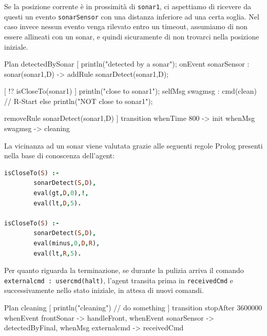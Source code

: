 \documentclass{../llncs}
\newcommand{\codescript}[1]{{\mbox{\small{\texttt{#1}}}}\xspace}
\newcommand{\code}[1]{{\color{blue}\small{\texttt{#1}}}}
\begin{document}
Se la posizione corrente è in prossimità di \code{sonar1}, ci aspettiamo di ricevere da questi un evento \codescript{sonarSensor} con una distanza inferiore ad una certa soglia. Nel caso invece nessun evento venga rilevato entro un timeout, assumiamo di non essere allineati con un sonar, e quindi sicuramente di non trovarci nella posizione iniziale.\\

\begin{qacode}[caption={SoftwareAgent, pt2}]
Plan detectedBySonar [
	println("detected by a sonar");
	onEvent sonarSensor : sonar(sonar1,D) -> addRule sonarDetect(sonar1,D);
	
	[ !? isCloseTo(sonar1) ] {
		println("close to sonar1");
		selfMsg swagmsg : cmd(clean) // R-Start
	}
	else
		println("NOT close to sonar1");
		
	removeRule sonarDetect(sonar1,D)
]
transition
	whenTime 800 -> init
	whenMsg swagmsg -> cleaning
\end{qacode}

La vicinanza ad un sonar viene valutata grazie alle seguenti regole Prolog presenti nella base di conoscenza dell'agent:\\

\begin{lstlisting}[language=Prolog, keywordstyle=\color{black}, caption={SoftwareAgent, Rules - pt1}]
isCloseTo(S) :-
		sonarDetect(S,D),
		eval(gt,D,0),!,
		eval(lt,D,5).
	
isCloseTo(S) :-
		sonarDetect(S,D),
		eval(minus,0,D,R),
		eval(lt,R,5).
\end{lstlisting}

\vspace{8px}

Per quanto riguarda la terminazione, se durante la pulizia arriva il comando \codescript{externalcmd : usercmd(halt)}, l'agent transita prima in \codescript{receivedCmd} e successivamente nello stato iniziale, in attesa di nuovi comandi.\\


\begin{qacode}[caption={SoftwareAgent, pt3}]
Plan cleaning [
	println("cleaning")
	// do something
]
transition stopAfter 3600000 
	whenEvent frontSonar -> handleFront,
	whenEvent sonarSensor -> detectedByFinal,
	whenMsg externalcmd -> receivedCmd
\end{qacode}
\end{document}
